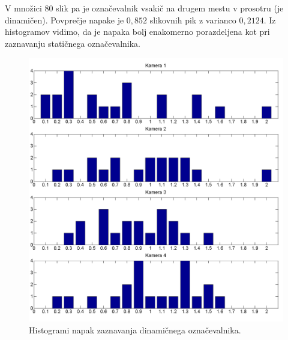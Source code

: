 \documentclass[a4paper, 12pt]{book}
\begin{document}
V množici 80 slik pa je označevalnik vsakič na drugem mestu v prosotru (je dinamičen). Povprečje napake je $0,852$ slikovnih pik z varianco $0,2124$. Iz histogramov vidimo, da je napaka bolj enakomerno porazdeljena kot pri zaznavanju statičnega označevalnika.

\begin{figure}[H]
\centering
\includegraphics[width=\textwidth,height=\textheight,keepaspectratio]{marker_detection_dynamic_bar.png}
\caption{Histogrami napak zaznavanja dinamičnega označevalnika.}
\end{figure}
\end{document}
